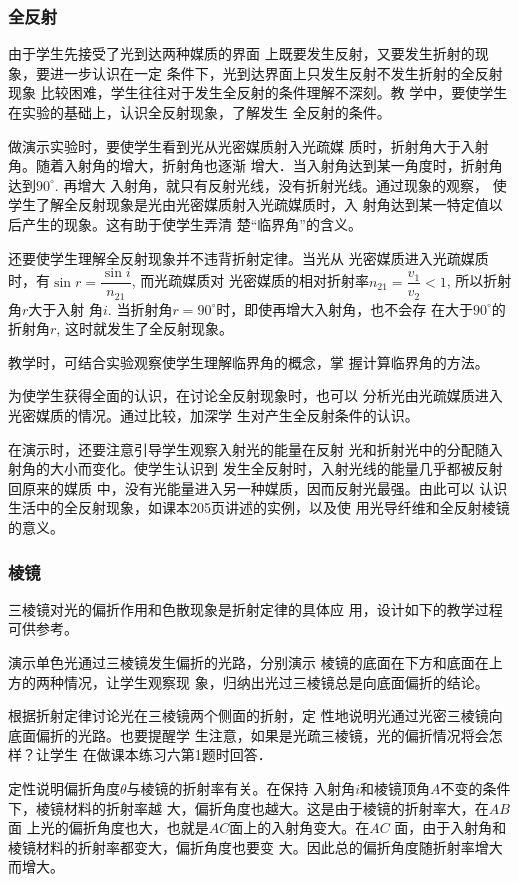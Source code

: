 \subsubsection{全反射}
 由于学生先接受了光到达两种媒质的界面
上既要发生反射，又要发生折射的现象，要进一步认识在一定
条件下，光到达界面上只发生反射不发生折射的全反射现象
比较困难，学生往往对于发生全反射的条件理解不深刻。教
学中，要使学生在实验的基础上，认识全反射现象，了解发生
全反射的条件。

做演示实验时，要使学生看到光从光密媒质射入光疏媒
质时，折射角大于入射角。随着入射角的增大，折射角也逐渐
增大．当入射角达到某一角度时，折射角达到$90^{\circ}$. 再增大
入射角，就只有反射光线，没有折射光线。通过现象的观察，
使学生了解全反射现象是光由光密媒质射入光疏媒质时，入
射角达到某一特定值以后产生的现象。这有助于使学生弄清
楚“临界角”的含义。

还要使学生理解全反射现象并不违背折射定律。当光从
光密媒质进入光疏媒质时，有$\sin r=\dfrac{\sin i}{n_{21}}$, 而光疏媒质对
光密媒质的相对折射率$n_{21}=\dfrac{v_1}{v_2}<1$, 所以折射角$r$大于入射
角$i$. 当折射角$r=90^{\circ}$时，即使再增大入射角，也不会存
在大于$90^{\circ}$的折射角$r$, 这时就发生了全反射现象。

教学时，可结合实验观察使学生理解临界角的概念，掌
握计算临界角的方法。

为使学生获得全面的认识，在讨论全反射现象时，也可以
分析光由光疏媒质进入光密媒质的情况。通过比较，加深学
生对产生全反射条件的认识。

在演示时，还要注意引导学生观察入射光的能量在反射
光和折射光中的分配随入射角的大小而变化。使学生认识到
发生全反射时，入射光线的能量几乎都被反射回原来的媒质
中，没有光能量进入另一种媒质，因而反射光最强。由此可以
认识生活中的全反射现象，如课本205页讲述的实例，以及使
用光导纤维和全反射棱镜的意义。

\subsubsection{棱镜}
三棱镜对光的偏折作用和色散现象是折射定律的具体应
用，设计如下的教学过程可供参考。

演示单色光通过三棱镜发生偏折的光路，分别演示
棱镜的底面在下方和底面在上方的两种情况，让学生观察现
象，归纳出光过三棱镜总是向底面偏折的结论。

根据折射定律讨论光在三棱镜两个侧面的折射，定
性地说明光通过光密三棱镜向底面偏折的光路。也要提醒学
生注意，如果是光疏三棱镜，光的偏折情况将会怎样？让学生
在做课本练习六第1题时回答．

定性说明偏折角度$\theta$与棱镜的折射率有关。在保持
入射角$i$和棱镜顶角$A$不变的条件下，棱镜材料的折射率越
大，偏折角度也越大。这是由于棱镜的折射率大，在$AB$面
上光的偏折角度也大，也就是$AC$面上的入射角变大。在$AC$
面，由于入射角和棱镜材料的折射率都变大，偏折角度也要变
大。因此总的偏折角度随折射率增大而增大。

